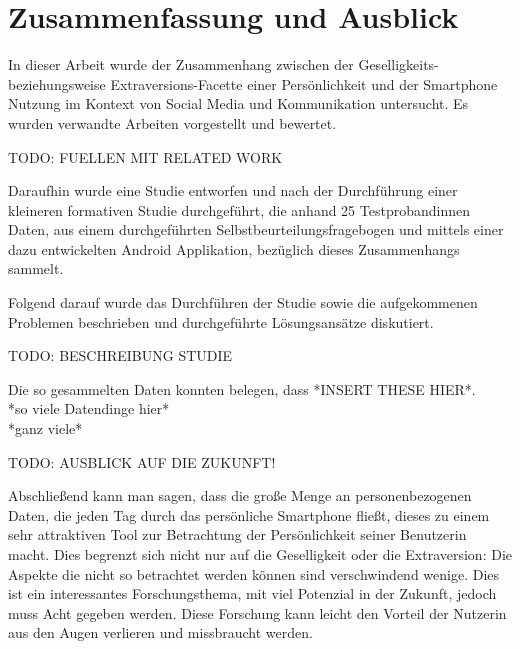 
\chapter{Zusammenfassung und Ausblick}
\label{ch:Zusammenfassung}


In dieser Arbeit wurde der Zusammenhang zwischen der Geselligkeits- beziehungsweise Extraversions-Facette
einer Persönlichkeit und der Smartphone Nutzung im Kontext von Social Media und Kommunikation untersucht.
Es wurden verwandte Arbeiten vorgestellt und bewertet.
\par
TODO: FUELLEN MIT RELATED WORK
\par
Daraufhin wurde eine Studie entworfen und nach der Durchführung einer kleineren formativen Studie durchgeführt, die anhand 25 Testprobandinnen Daten, aus einem durchgeführten Selbstbeurteilungsfragebogen und
 mittels einer dazu entwickelten Android Applikation, bezüglich dieses Zusammenhangs sammelt.

Folgend darauf wurde das Durchführen der Studie sowie die aufgekommenen Problemen beschrieben und durchgeführte Lösungsansätze diskutiert.
\par
TODO: BESCHREIBUNG STUDIE
\par
Die so gesammelten Daten konnten belegen, dass *INSERT THESE HIER*.\\
*so viele Datendinge hier*\\
*ganz viele*
\par
TODO: AUSBLICK AUF DIE ZUKUNFT!
\par
Abschließend kann man sagen, dass die große Menge an personenbezogenen Daten,
die jeden Tag durch das persönliche Smartphone fließt, dieses zu einem sehr attraktiven Tool zur Betrachtung der Persönlichkeit seiner Benutzerin macht.
Dies begrenzt sich nicht nur auf die Geselligkeit oder die Extraversion: Die Aspekte die nicht so betrachtet werden können sind verschwindend wenige.
Dies ist ein interessantes Forschungsthema, mit viel Potenzial in der Zukunft, jedoch muss Acht gegeben werden.
Diese Forschung kann leicht den Vorteil der Nutzerin aus den Augen verlieren und missbraucht werden. 


